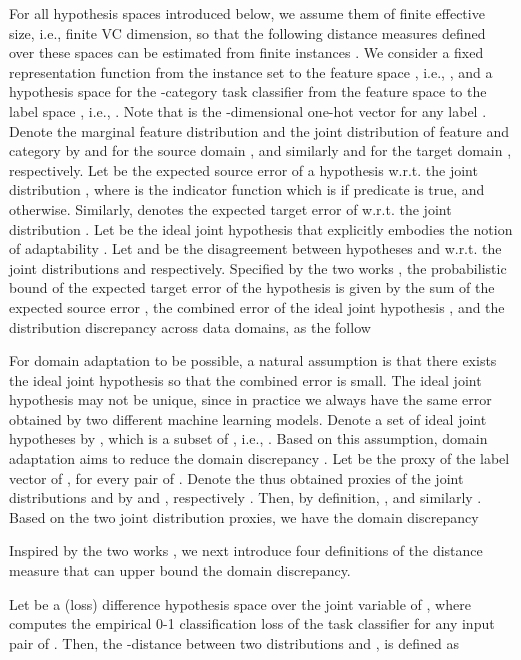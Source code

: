 \documentclass[letterpaper]{article} \usepackage{aaai20}  \usepackage{times}  \usepackage{helvet} \usepackage{courier}  \usepackage[hyphens]{url}  \usepackage{graphicx} \urlstyle{rm} \def\UrlFont{\rm}  \usepackage{graphicx}  \frenchspacing  \setlength{\pdfpagewidth}{8.5in}  \setlength{\pdfpageheight}{11in}
\begin{document}
For all hypothesis spaces introduced below, we assume them of finite effective size, i.e., finite VC dimension, so that the following distance measures defined over these spaces can be estimated from finite instances \cite{da_theory2}. 
We consider a fixed representation function  from the instance set  to the feature space , i.e., , and a hypothesis space  for the -category task classifier  from the feature space  to the label space , i.e.,  \cite{dann}. Note that  is the -dimensional one-hot vector for any label . Denote the marginal feature distribution and the joint distribution of feature and category by  and  for the source domain , and similarly  and  for the target domain , respectively. Let  be the expected source error of a hypothesis  w.r.t. the joint distribution , where  is the indicator function which is  if predicate  is true, and  otherwise. Similarly,  denotes the expected target error of  w.r.t. the joint distribution . Let  be the ideal joint hypothesis that explicitly embodies the notion of adaptability \cite{da_theory2}. Let  and  be the disagreement between hypotheses  and  w.r.t. the joint distributions  and  respectively. Specified by the two works \cite{da_theory1,da_theory2}, the probabilistic bound of the expected target error  of the hypothesis  is given by the sum of the expected source error , the combined error  of the ideal joint hypothesis , and the distribution discrepancy across data domains, as the follow


For domain adaptation to be possible, a natural assumption is that there exists the ideal joint hypothesis  so that the combined error  is small. The ideal joint hypothesis  may not be unique, since in practice we always have the same error obtained by two different machine learning models. Denote a set of ideal joint hypotheses by , which is a subset of , i.e., . Based on this assumption, domain adaptation aims to reduce the domain discrepancy . Let  be the proxy of the label vector  of , for every pair of . Denote the thus obtained proxies of the joint distributions  and  by  and , respectively \cite{jointDistOptimal}. Then, by definition, , and similarly . Based on the two joint distribution proxies, we have the domain discrepancy 


Inspired by the two works \cite{cdan,da_theory3}, we next introduce four definitions of the distance measure that can upper bound the domain discrepancy.

\begin{definition}
	Let  be a (loss) difference hypothesis space over the joint variable of , where  computes the empirical 0-1 classification loss of the task classifier  for any input pair of . Then, the -distance between two distributions  and , is defined as 
	
\end{definition}
\end{document}
